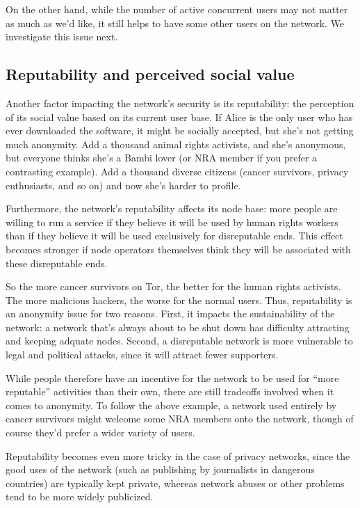 \documentclass{llncs}
\begin{document}

On the other hand, while the number of active concurrent users may not
matter as much as we'd like, it still helps to have some other users
on the network. We investigate this issue next.

\subsection{Reputability and perceived social value}
Another factor impacting the network's security is its reputability:
the perception of its social value based on its current user base. If Alice is
the only user who has ever downloaded the software, it might be socially
accepted, but she's not getting much anonymity. Add a thousand animal rights
activists, and she's anonymous, but everyone thinks she's a Bambi lover (or
NRA member if you prefer a contrasting example). Add a thousand
diverse citizens (cancer survivors, privacy enthusiasts, and so on)
and now she's harder to profile.

Furthermore, the network's reputability affects its node base: more people
are willing to run a service if they believe it will be used by human rights
workers than if they believe it will be used exclusively for disreputable
ends.  This effect becomes stronger if node operators themselves think they
will be associated with these disreputable ends.

So the more cancer survivors on Tor, the better for the human rights
activists. The more malicious hackers, the worse for the normal users. Thus,
reputability is an anonymity issue for two reasons. First, it impacts
the sustainability of the network: a network that's always about to be
shut down has difficulty attracting and keeping adquate nodes.
Second, a disreputable network is more vulnerable to legal and
political attacks, since it will attract fewer supporters.

While people therefore have an incentive for the network to be used for
``more reputable'' activities than their own, there are still tradeoffs
involved when it comes to anonymity. To follow the above example, a
network used entirely by cancer survivors might welcome some NRA members
onto the network, though of course they'd prefer a wider
variety of users.

Reputability becomes even more tricky in the case of privacy networks,
since the good uses of the network (such as publishing by journalists in
dangerous countries) are typically kept private, whereas network abuses
or other problems tend to be more widely publicized.
\end{document}
